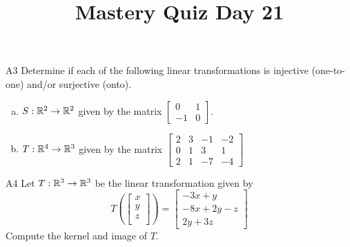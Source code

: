 \documentclass{sbgLAquiz}
\title{Mastery Quiz Day 21 }
\begin{document}
\begin{problem}{A3}
Determine if each of the following linear transformations is injective (one-to-one) and/or surjective (onto).
\begin{enumerate}[(a)]
\item $S: \mathbb{R}^2 \rightarrow \mathbb{R}^2$ given by the matrix $\begin{bmatrix} 0 & 1 \\ -1 & 0 \end{bmatrix}$.
\item $T: \mathbb{R}^4 \rightarrow \mathbb{R}^3$ given by the matrix $\begin{bmatrix} 2 & 3 & -1 & -2 \\ 0 & 1 & 3 & 1 \\ 2 & 1 & -7 & -4 \end{bmatrix}$
\end{enumerate}
\end{problem}

\begin{problem}{A4}
Let $T: \mathbb{R}^3\rightarrow \mathbb{R}^3$ be the linear transformation given by $$T\left(\begin{bmatrix} x \\ y \\ z \\  \end{bmatrix} \right) = \begin{bmatrix} -3x+y \\ -8x+2y-z \\ 2y+3z \end{bmatrix}$$
Compute the kernel and image of $T$.
\end{problem}
\end{document}
